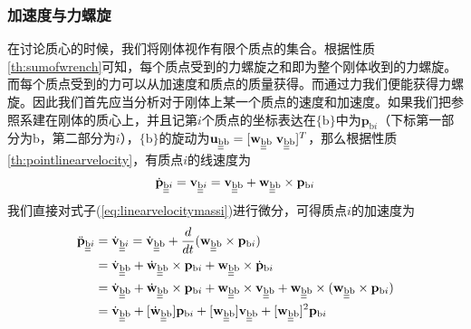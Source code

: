 \documentclass[12pt, a4paper, article, UTF8]{ctexart}
\begin{document}
\subsubsection{加速度与力螺旋}
在讨论质心的时候，我们将刚体视作有限个质点的集合。根据性质\ref{th:sumofwrench}可知，每个质点受到的力螺旋之和即为整个刚体收到的力螺旋。而每个质点受到的力可以从加速度和质点的质量获得。而通过力我们便能获得力螺旋。因此我们首先应当分析对于刚体上某一个质点的速度和加速度。如果我们把参照系建在刚体的质心上，并且记第$i$个质点的坐标表达在$\{\text{b}\}$中为$\mathbf{p}_{\text{b}i}$（下标第一部分为$\text{b}$，第二部分为$i$），$\{\text{b}\}$的旋动为$\mathbf{u}_\text{\underline{\underline{b}}b} = [\mathbf{w}_\text{\underline{\underline{b}}b} \; \mathbf{v}_\text{\underline{\underline{b}}b} ]^T$，那么根据性质\ref{th:pointlinearvelocity}，有质点$i$的线速度为
\begin{align}
\dot{\mathbf{p}}_{\text{\underline{\underline{b}}}i} = \mathbf{v}_{\text{\underline{\underline{b}}}i} =\mathbf{v}_{\text{\underline{\underline{b}}b}} + \mathbf{w}_{\text{\underline{\underline{b}}b}} \times \mathbf{p}_{\text{b}i}  \label{eq:linearvelocitymassi}
\end{align}
我们直接对式子(\ref{eq:linearvelocitymassi})进行微分，可得质点$i$的加速度为
\begin{align}
\ddot{\mathbf{p}}_{\text{\underline{\underline{b}}}i} &= \dot{\mathbf{v}}_{\text{\underline{\underline{b}}}i} = \dot{\mathbf{v}}_{\text{\underline{\underline{b}}b}} + \frac{d}{dt}(\mathbf{w}_{\text{\underline{\underline{b}}b}} \times \mathbf{p}_{\text{b}i}) \nonumber\\
&= \dot{\mathbf{v}}_{\text{\underline{\underline{b}}b}} + \dot{\mathbf{w}}_{\text{\underline{\underline{b}}b}}\times \mathbf{p}_{\text{b}i} + \mathbf{w}_{\text{\underline{\underline{b}}b}} \times \dot{\mathbf{p}}_{\text{b}i} \nonumber \\
&= \dot{\mathbf{v}}_{\text{\underline{\underline{b}}b}} + \dot{\mathbf{w}}_{\text{\underline{\underline{b}}b}}\times \mathbf{p}_{\text{b}i} + \mathbf{w}_{\text{\underline{\underline{b}}b}} \times \mathbf{v}_{\text{\underline{\underline{b}}b}} + \mathbf{w}_{\text{\underline{\underline{b}}b}} \times (\mathbf{w}_{\text{\underline{\underline{b}}b}} \times \mathbf{p}_{\text{b}i}) \nonumber \\
&=  \dot{\mathbf{v}}_{\text{\underline{\underline{b}}b}}  + [\dot{\mathbf{w}}_{\text{\underline{\underline{b}}b}}] \mathbf{p}_{\text{b}i} + [\mathbf{w}_{\text{\underline{\underline{b}}b}} ] \mathbf{v}_{\text{\underline{\underline{b}}b}} + [\mathbf{w}_{\text{\underline{\underline{b}}b}} ]^2 \mathbf{p}_{\text{b}i}  \label{eq:linearaccelerationmassi}
\end{align}
\end{document}
